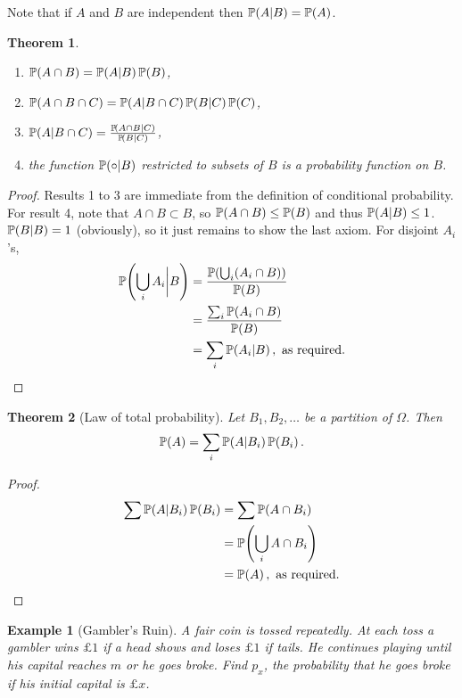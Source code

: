 \documentclass{notes}
\theoremstyle{plain}
\newtheorem{theorem}{Theorem}[chapter]
\newtheorem*{example}{Example}
\newcommand{\bP}{\mathbb{P}}
\newcommand{\prob}[1]{\bP \negthinspace\left(#1\right)}
\begin{document}
Note that if $A$ and $B$ are independent then $\prob{A | B} = \prob{A}$.

\begin{theorem}
\begin{enumerate}
\item $\prob{A \cap B} = \prob{A | B} \prob{B}$,
\item $\prob{A \cap B \cap C} = \prob{A | B \cap C} \prob{B | C} \prob{C}$,
\item $\prob{A | B \cap C} = \tfrac{\prob{A \cap B | C}}{\prob{B | C}}$,
\item the function $\prob{ \circ | B}$ restricted to subsets of $B$ is a
probability function on $B$.
\end{enumerate}
\end{theorem}

\begin{proof}
Results 1 to 3 are immediate from the definition of conditional probability.
For result 4, note that $A \cap B \subset B$, so $\prob{A \cap B} \le \prob{B}$
and thus $\prob{A | B} \le 1$.  $\prob{B | B} = 1$ (obviously), so it just
remains to show the last axiom. For disjoint $A_i$'s,
\begin{align*}
\prob{\bigcup_i A_i \bigg| B} & = \frac{\prob{\bigcup_i (A_i \cap B)}}{\prob{B}} \\
& = \frac{\sum_i \prob{A_i \cap B}}{\prob{B}} \\
&= \sum_i \prob{A_i | B}, \text{ as required.}
\end{align*}
\end{proof}

\begin{theorem}[Law of total probability]
Let $B_1, B_2, \dots$ be a partition of $\Omega$.  Then 
\[
\prob{A} = \sum_i \prob{A | B_i} \prob{B_i}.
\]
\end{theorem}

\begin{proof}
\begin{align*}
\sum \prob{A | B_i} \prob{B_i} & = \sum \prob{A \cap B_i} \\
& = \prob{\bigcup_i A \cap B_i} \\
& = \prob{A}, \text{ as required.}
\end{align*}
\end{proof}

\begin{example}[Gambler's Ruin]
A fair coin is tossed repeatedly.  At each toss a gambler wins $\pounds 1$
if a head shows and loses $\pounds 1$ if tails.  He continues playing until
his capital reaches $m$ or he goes broke.  Find $p_x$, the probability that
he goes broke if his initial capital is $\pounds x$.
\end{example}
\end{document}
